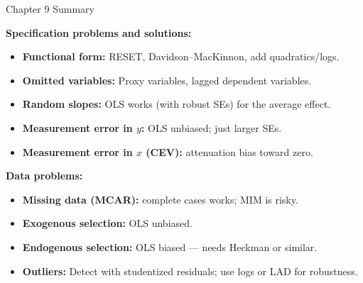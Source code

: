 \documentclass[aspectratio=169, 12pt]{beamer}
\begin{document}
\begin{frame}[shrink=20]{Chapter 9 Summary}

  \begin{highlightbox}
    \textbf{Specification problems and solutions:}
    \begin{itemize}\setlength{\itemsep}{1pt}
      \item \textbf{Functional form:} RESET, Davidson--MacKinnon, add quadratics/logs.
      \item \textbf{Omitted variables:} Proxy variables, lagged dependent variables.
      \item \textbf{Random slopes:} OLS works (with robust SEs) for the average effect.
      \item \textbf{Measurement error in $y$:} OLS unbiased; just larger SEs.
      \item \textbf{Measurement error in $x$ (CEV):} attenuation bias toward zero.
    \end{itemize}
  \end{highlightbox}

  \begin{highlightbox}
    \textbf{Data problems:}
    \begin{itemize}\setlength{\itemsep}{1pt}
      \item \textbf{Missing data (MCAR):} complete cases works; MIM is risky.
      \item \textbf{Exogenous selection:} OLS unbiased.
      \item \textbf{Endogenous selection:} OLS biased — needs Heckman or similar.
      \item \textbf{Outliers:} Detect with studentized residuals; use logs or LAD for
      robustness.
    \end{itemize}
  \end{highlightbox}

\end{frame}
\end{document}
